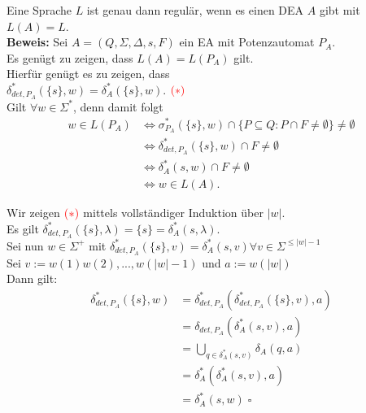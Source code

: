 \begin{satz}{}
    Eine Sprache $L$ ist genau dann regulär, wenn es einen DEA $A$ gibt mit $L(A)=L$. \\

    \textbf{Beweis:} Sei $A = (Q,\Sigma,\Delta,s,F)$ ein EA mit Potenzautomat $P_A$. \\
    Es genügt zu zeigen, dass $L(A) = L(P_A)$ gilt. \\

    Hierfür genügt es zu zeigen, dass \\
    $\delta^*_{det,P_A}(\{s\},w) = \delta^*_A(\{s\},w)$. $ \color{red}{(*)}$ \\

    Gilt $\forall w \in \Sigma^*$, denn damit folgt
    \begin{align*}
        w \in L(P_A) &\Leftrightarrow \sigma^*_{P_A}(\{s\},w) \cap \{P \subseteq Q : P \cap F \neq \emptyset\} \neq \emptyset \\
        &\Leftrightarrow \delta^*_{det,P_A}(\{s\},w) \cap F \neq \emptyset \\
        &\Leftrightarrow \delta^*_A(s,w) \cap F \neq \emptyset \\
        &\Leftrightarrow w \in L(A).
    \end{align*}

    Wir zeigen $\color{red}{(*)}$ mittels vollständiger Induktion über $|w|$. \\

    Es gilt $\delta^*_{det,P_A}(\{s\},\lambda) = \{s\} = \delta^*_A(s,\lambda).$ \\

    Sei nun $w \in \Sigma^+$ mit $\delta^*_{det,P_A}(\{s\},v) = \delta^*_A(s,v) \forall v \in \Sigma^{\leq|w|-1}$ \\

    Sei $v := w(1)w(2),...,w(|w|-1)$ und $a := w(|w|)$ \\

    Dann gilt: 
    \begin{align*}
        \delta^*_{det,P_A}(\{s\},w) &= \delta^*_{det,P_A}(\delta^*_{det,P_A}(\{s\},v),a) \\
        &= \delta_{det,P_A}(\delta^*_A(s,v),a) \\
        &= \bigcup\limits_{q \in \delta^*_A(s,v)}\delta_A(q,a) \\
        &= \delta^*_A(\delta^*_A(s,v),a) \\
        &= \delta^*_A(s,w) \; \square
    \end{align*}
\end{satz}